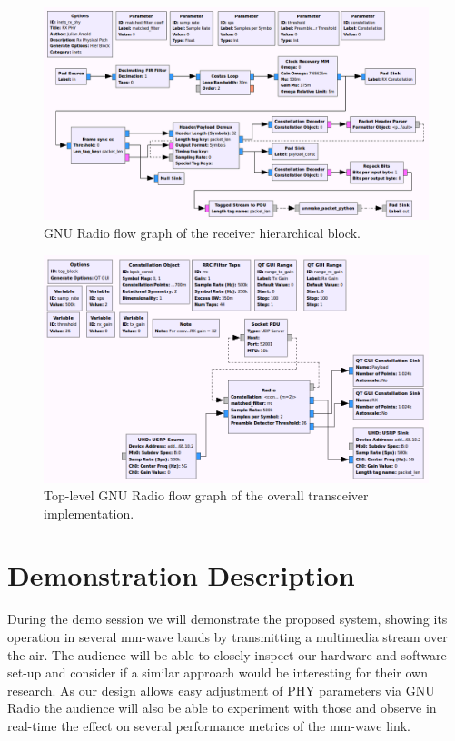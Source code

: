 \documentclass{sig-alternate}
\begin{document}
\begin{figure}[p]
\center
\includegraphics[scale=0.41]{rx_path.png}
\caption{GNU Radio flow graph of the receiver hierarchical block.}
\label{fig:rx-path}
\end{figure}

\begin{figure}
\center
\includegraphics[scale=0.41]{transceiver.png}
\caption{Top-level GNU Radio flow graph of the overall transceiver implementation.}
\label{fig:top-block}
\end{figure}

\section{Demonstration Description} 
During the demo session we will demonstrate the proposed system, showing its operation in several mm-wave bands by transmitting a multimedia stream over the air. %
The audience will be able to closely inspect our hardware and software set-up and consider if a similar approach would be interesting for their own research. %
As our design allows easy adjustment of PHY parameters via GNU Radio the audience will also be able to experiment with those %
and observe  in real-time the effect on several performance metrics of the mm-wave link.
\end{document}
